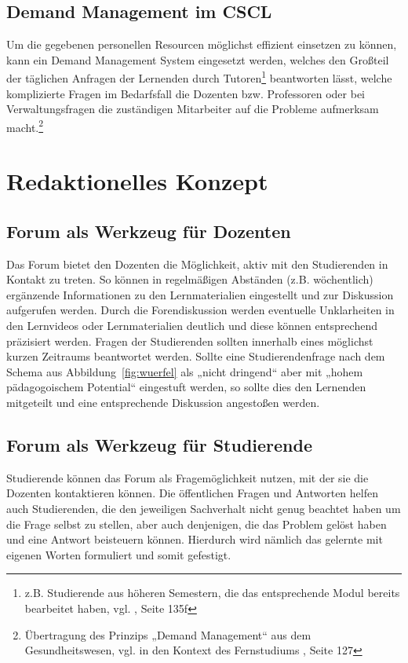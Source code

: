 
\subsection{Demand Management im CSCL} %
\label{sub:demand_management}
Um die gegebenen personellen Resourcen möglichst effizient einsetzen zu können, kann ein Demand Management System eingesetzt werden, welches den Großteil der täglichen Anfragen der Lernenden durch Tutoren\footnote{z.B. Studierende aus höheren Semestern, die das entsprechende Modul bereits bearbeitet haben, vgl. \cite{ojstersek}, Seite 135f} beantworten lässt, welche komplizierte Fragen im Bedarfsfall die Dozenten bzw. Professoren oder bei Verwaltungsfragen  die zuständigen Mitarbeiter auf die Probleme aufmerksam macht.\footnote{Übertragung des Prinzips „Demand Management“ aus dem Gesundheitswesen, vgl. \cite{gabler:demandmanagement} in den Kontext des Fernstudiums \cite{ojstersek}, Seite 127}


\newpage
\section{Redaktionelles Konzept} %
\label{sec:redaktionelles_konzept}
\subsection{Forum als Werkzeug für Dozenten} %
\label{sub:forum_als_werkzeug_fur_dozenten}
Das Forum bietet den Dozenten die Möglichkeit, aktiv mit den Studierenden in Kontakt zu treten. So können in regelmäßigen Abständen (z.B. wöchentlich) ergänzende Informationen zu den Lernmaterialien eingestellt und zur Diskussion aufgerufen werden. Durch die Forendiskussion werden eventuelle Unklarheiten in den Lernvideos oder Lernmaterialien deutlich und diese können entsprechend präzisiert werden. Fragen der Studierenden sollten innerhalb eines möglichst kurzen Zeitraums beantwortet werden. Sollte eine Studierendenfrage nach dem Schema aus Abbildung~\ref{fig:wuerfel} als „nicht dringend“ aber mit „hohem pädagogoischem Potential“ eingestuft werden, so sollte dies den Lernenden mitgeteilt und eine entsprechende Diskussion angestoßen werden.

\subsection{Forum als Werkzeug für Studierende} %
\label{sub:forum_als_werkzeug_fur_studierende}
Studierende können das Forum als Fragemöglichkeit nutzen, mit der sie die Dozenten kontaktieren können. Die öffentlichen Fragen und Antworten helfen auch Studierenden, die den jeweiligen Sachverhalt nicht genug beachtet haben um die Frage selbst zu stellen, aber auch denjenigen, die das Problem gelöst haben und eine Antwort beisteuern können. Hierdurch wird nämlich das gelernte mit eigenen Worten formuliert und somit gefestigt.

